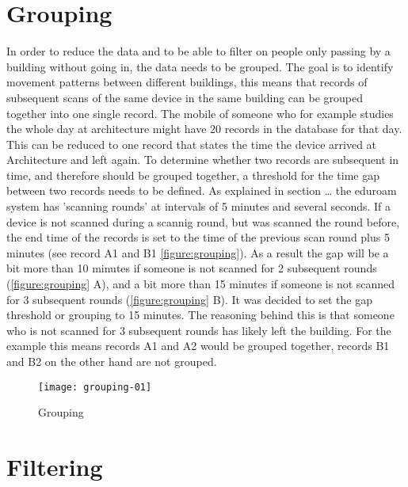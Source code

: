 \section{Grouping}\label{grouping}
In order to reduce the data and to be able to filter on people only passing by a building without going in, the data needs to be grouped. The goal is to identify movement patterns between different buildings, this means that records of subsequent scans of the same device in the same building can be grouped together into one single record. The mobile of someone who for example studies the whole day at architecture might have 20 records in the database for that day. This can be reduced to one record that states the time the device arrived at Architecture and left again. To determine whether two records are subsequent in time, and therefore should be grouped together, a threshold for the time gap between two records needs to be defined. As explained in section … the eduroam system has 'scanning rounds' at intervals of 5 minutes and several seconds. If a device is not scanned during a scannig round, but was scanned the round before, the end time of the records is set to the time of the previous scan round plus 5 minutes (see record A1 and B1 \autoref{figure:grouping}). As a result the gap will be a bit more than 10 minutes if someone is not scanned for 2 subsequent rounds (\autoref{figure:grouping} A), and a bit more than 15 minutes if someone is not scanned for 3 subsequent rounds (\autoref{figure:grouping} B). It was decided to set the gap threshold or grouping to 15 minutes. The reasoning behind this is that someone who is not scanned for 3 subsequent rounds has likely left the building. For the example this means records A1 and A2 would be grouped together, records B1 and B2 on the other hand are not grouped.

\begin{figure}[H]
\centering
\texttt{[image: grouping-01]}
\captionsetup{justification=centering}
\caption{Grouping}
\label{figure:grouping}
\end{figure}

\section{Filtering}\label{filtering}

